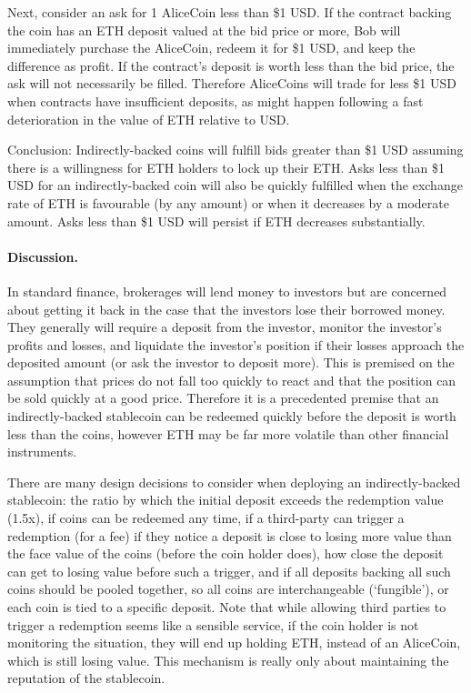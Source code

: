 
Next, consider an ask for 1 AliceCoin less than \$1 USD. If the contract backing the coin has an ETH deposit valued at the bid price or more, Bob will immediately purchase the AliceCoin, redeem it for \$1 USD, and keep the difference as profit. If the contract's deposit is worth less than the bid price, the ask will not necessarily be filled. Therefore AliceCoins will trade for less \$1 USD when contracts have insufficient deposits, as might happen following a fast deterioration in the value of ETH relative to USD.

Conclusion: Indirectly-backed coins will fulfill bids greater than \$1 USD assuming there is a willingness for ETH holders to lock up their ETH. Asks less than \$1 USD for an indirectly-backed coin will also be quickly fulfilled when the exchange rate of ETH is favourable (by any amount) or when it decreases by a moderate amount. Asks less than \$1 USD will persist if ETH decreases substantially.

\paragraph{Discussion.} In standard finance, brokerages will lend money to investors but are concerned about getting it back in the case that the investors lose their borrowed money. They generally will require a deposit from the investor, monitor the investor's profits and losses, and liquidate the investor's position if their losses approach the deposited amount (or ask the investor to deposit more). This is premised on the assumption that prices do not fall too quickly to react and that the position can be sold quickly at a good price. Therefore it is a precedented premise that an indirectly-backed stablecoin can be redeemed quickly before the deposit is worth less than the coins, however ETH may be far more volatile than other financial instruments.

There are many design decisions to consider when deploying an indirectly-backed stablecoin: the ratio by which the initial deposit exceeds the redemption value (\eg 1.5x), if coins can be redeemed any time, if a third-party can trigger a redemption (\eg for a fee) if they notice a deposit is close to losing more value than the face value of the coins (before the coin holder does), how close the deposit can get to losing value before such a trigger, and if all deposits backing all such coins should be pooled together, so all coins are interchangeable (`fungible'), or each coin is tied to a specific deposit. Note that while allowing third parties to trigger a redemption seems like a sensible service, if the coin holder is not monitoring the situation, they will end up holding ETH, instead of an AliceCoin, which is still losing value. This mechanism is really only about maintaining the reputation of the stablecoin.

